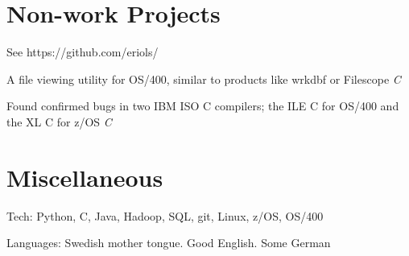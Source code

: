 \documentclass[letterpaper]{scrartcl}
\begin{document}
\section*{Non-work Projects}
\begin{list1}
\item
  \begin{list2}
  \item See https://github.com/eriols/
    \begin{list3}
    \item A file viewing utility for OS/400, similar to products like wrkdbf or Filescope \hfill \emph{C}
    \end{list3}
  \item Found confirmed bugs in two IBM ISO C compilers; the ILE C for OS/400 and the XL C for z/OS \hfill \emph{C}

  \end{list2}
\end{list1}

\section*{Miscellaneous}
\begin{list1}
\item
  \begin{list2}
    \item Tech: Python, C, Java, Hadoop, SQL, git, Linux, z/OS, OS/400
    \item Languages: Swedish mother tongue. Good English. Some German
  \end{list2}
\end{list1}
\end{document}
